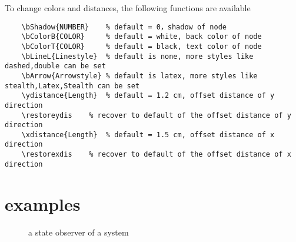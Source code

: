 \documentclass[a4paper,onecolumn]{IEEETran}
\begin{document}
To change colors and distances, the following functions are available

\begin{verbatim}
    \bShadow{NUMBER}  	% default = 0，shadow of node
    \bColorB{COLOR}   	% default = white, back color of node
    \bColorT{COLOR}		% default = black, text color of node
    \bLineL{Linestyle}  % default is none, more styles like dashed,double can be set
    \bArrow{Arrowstyle} % default is latex, more styles like stealth,Latex,Stealth can be set
    \ydistance{Length}	% default = 1.2 cm, offset distance of y direction
    \restoreydis    % recover to default of the offset distance of y direction
    \xdistance{Length}	% default = 1.5 cm, offset distance of x direction
    \restorexdis 	% recover to default of the offset distance of x direction
\end{verbatim}


\newpage

\section{examples}

\begin{figure}[!htbp]
    \caption{a state observer of a system}
\end{figure}
\end{document}
